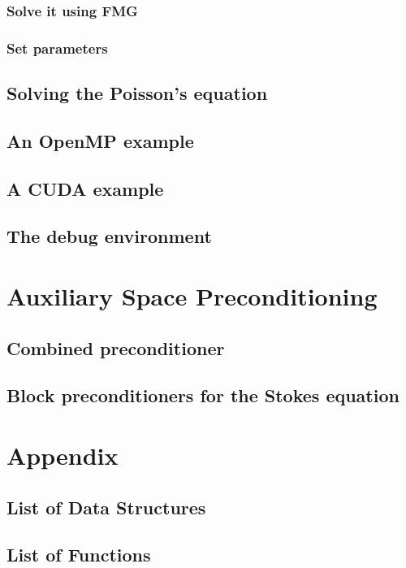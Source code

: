 \documentclass[11pt]{memoir}
\begin{document}
\subsection{Solve it using FMG}

\subsection{Set parameters}

\section{Solving the Poisson's equation}

\section{An OpenMP example}

\section{A CUDA example}

\section{The debug environment}

\chapter{Auxiliary Space Preconditioning}\label{ch:asp}

\section{Combined preconditioner}

\section{Block preconditioners for the Stokes equation}

\chapter{Appendix}\label{ch:append}

\section{List of Data Structures}

\section{List of Functions}


\newpage


\end{document}
